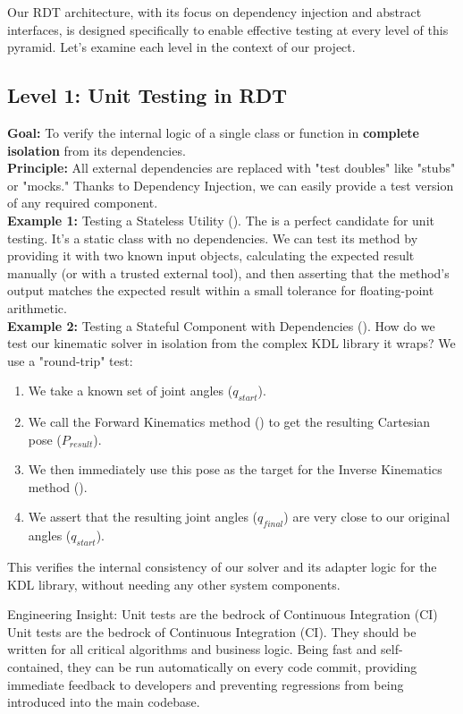 Our RDT architecture, with its focus on dependency injection and abstract interfaces, is designed specifically to enable effective testing at every level of this pyramid. Let's examine each level in the context of our project.

\subsection*{Level 1: Unit Testing in RDT}
\label{subsec:unit_testing}


\textbf{Goal:} To verify the internal logic of a single class or function in \textbf{complete isolation} from its dependencies. \\
\textbf{Principle:} All external dependencies are replaced with "test doubles" like "stubs" or "mocks." Thanks to Dependency Injection, we can easily provide a test version of any required component. \\
\textbf{Example 1:} Testing a Stateless Utility ().
    The  is a perfect candidate for unit testing. It's a static class with no dependencies. We can test its  method by providing it with two known input  objects, calculating the expected result manually (or with a trusted external tool), and then asserting that the method's output matches the expected result within a small tolerance for floating-point arithmetic. \\
\textbf{Example 2:} Testing a Stateful Component with Dependencies ().
    How do we test our kinematic solver in isolation from the complex KDL library it wraps? We use a "round-trip" test:
        \begin{enumerate}
            \item We take a known set of joint angles (\(q_{start}\)).
            \item We call the Forward Kinematics method () to get the resulting Cartesian pose (\(P_{result}\)).
            \item We then immediately use this pose as the target for the Inverse Kinematics method ().
            \item We assert that the resulting joint angles (\(q_{final}\)) are very close to our original angles (\(q_{start}\)).
        \end{enumerate}
        This verifies the internal consistency of our solver and its adapter logic for the KDL library, without needing any other system components.
\begin{tipbox}{Engineering Insight: Unit tests are the bedrock of Continuous Integration (CI)}
Unit tests are the bedrock of Continuous Integration (CI). They should be written for all critical algorithms and business logic. Being fast and self-contained, they can be run automatically on every code commit, providing immediate feedback to developers and preventing regressions from being introduced into the main codebase.
\end{tipbox}

